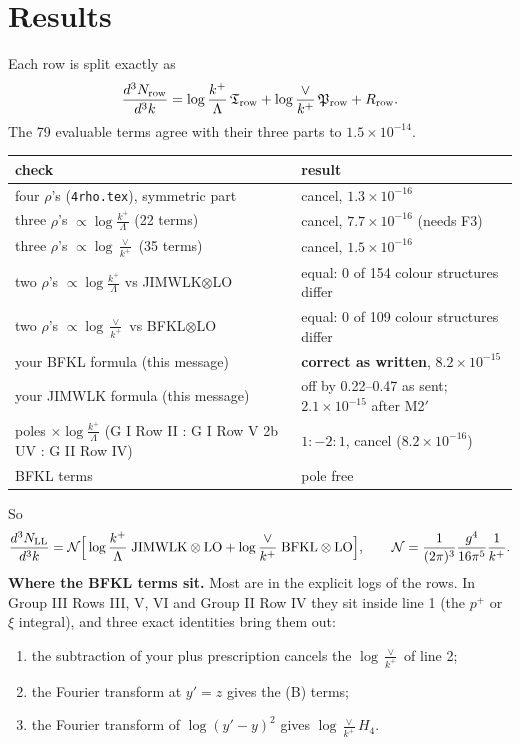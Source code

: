 \documentclass[10pt]{article}
\newcommand{\NLO}[1]{\frac{d^3N_{#1}}{d^3k}}
\begin{document}
\section{Results}
Each row is split exactly as
\begin{equation*}
\NLO{\rm row}=\log\frac{k^+}{\Lambda}\,\mathfrak T_{\rm row}+\log\frac{\vee}{k^+}\,\mathfrak P_{\rm row}+R_{\rm row}.
\end{equation*}
The 79 evaluable terms agree with their three parts to $1.5\times10^{-14}$.
\begin{center}
\renewcommand{\arraystretch}{1.3}
\begin{tabular}{@{}p{}p{}@{}}\toprule
check & result\\\midrule
four $\rho$'s (\texttt{4rho.tex}), symmetric part & cancel, $1.3\times10^{-16}$\\
three $\rho$'s $\propto\log\frac{k^+}{\Lambda}$ (22 terms) & cancel, $7.7\times10^{-16}$ (needs F3)\\
three $\rho$'s $\propto\log\frac{\vee}{k^+}$ (35 terms) & cancel, $1.5\times10^{-16}$\\
two $\rho$'s $\propto\log\frac{k^+}{\Lambda}$ vs JIMWLK$\otimes$LO & equal: 0 of 154 colour structures differ\\
two $\rho$'s $\propto\log\frac{\vee}{k^+}$ vs BFKL$\otimes$LO & equal: 0 of 109 colour structures differ\\
your BFKL formula (this message) & \textbf{correct as written}, $8.2\times10^{-15}$\\
your JIMWLK formula (this message) & off by 0.22--0.47 as sent; $2.1\times10^{-15}$ after M2$'$\\
poles $\times\log\frac{k^+}{\Lambda}$ (G I Row II : G I Row V 2b UV : G II Row IV) & $1:-2:1$, cancel ($8.2\times10^{-16}$)\\
BFKL terms & pole free\\\bottomrule
\end{tabular}
\end{center}
So
\begin{equation*}
\NLO{\rm LL}=\mathcal N\Big[\log\frac{k^+}{\Lambda}\;{\rm JIMWLK}\otimes{\rm LO}+\log\frac{\vee}{k^+}\;{\rm BFKL}\otimes{\rm LO}\Big],\qquad\mathcal N=\frac{1}{(2\pi)^3}\frac{g^4}{16\pi^5}\frac{1}{k^+}.
\end{equation*}
\textbf{Where the BFKL terms sit.} Most are in the explicit logs of the rows. In Group III Rows III, V, VI and Group II Row IV they sit inside line 1 (the $p^+$ or $\xi$ integral), and three exact identities bring them out:
\begin{enumerate}
\item the subtraction of your plus prescription cancels the $\log\frac{\vee}{k^+}$ of line 2;
\item the Fourier transform at $y'=z$ gives the (B) terms;
\item the Fourier transform of $\log(y'-y)^2$ gives $\log\frac{\vee}{k^+}H_4$.
\end{enumerate}
\end{document}
